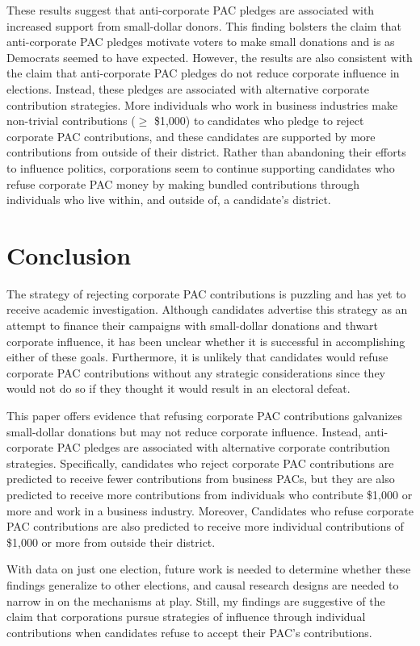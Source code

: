 \documentclass[12pt]{article}
\begin{document}
These results suggest that anti-corporate PAC pledges are associated with increased support from small-dollar donors. This finding bolsters the claim that anti-corporate PAC pledges motivate voters to make small donations and is as Democrats seemed to have expected. However, the results are also consistent with the claim that anti-corporate PAC pledges do not reduce corporate influence in elections. Instead, these pledges are associated with alternative corporate contribution strategies. More individuals who work in business industries make non-trivial contributions ($\geq$ \$1,000) to candidates who pledge to reject corporate PAC contributions, and these candidates are supported by more contributions from outside of their district. Rather than abandoning their efforts to influence politics, corporations seem to continue supporting candidates who refuse corporate PAC money by making bundled contributions through individuals who live within, and outside of, a candidate's district.


\section{Conclusion} \label{sec: conclusion}

The strategy of rejecting corporate PAC contributions is puzzling and has yet to receive academic investigation. Although candidates advertise this strategy as an attempt to finance their campaigns with small-dollar donations and thwart corporate influence, it has been unclear whether it is successful in accomplishing either of these goals. Furthermore, it is unlikely that candidates would refuse corporate PAC contributions without any strategic considerations since they would not do so if they thought it would result in an electoral defeat. 

This paper offers evidence that refusing corporate PAC contributions galvanizes small-dollar donations but may not reduce corporate influence. Instead, anti-corporate PAC pledges are associated with alternative corporate contribution strategies. Specifically, candidates who reject corporate PAC contributions are predicted to receive fewer contributions from business PACs, but they are also predicted to receive more contributions from individuals who contribute \$1,000 or more and work in a business industry. Moreover, Candidates who refuse corporate PAC contributions are also predicted to receive more individual contributions of \$1,000 or more from outside their district.   

With data on just one election, future work is needed to determine whether these findings generalize to other elections, and causal research designs are needed to narrow in on the mechanisms at play. Still, my findings are suggestive of the claim that corporations pursue strategies of influence through individual contributions when candidates refuse to accept their PAC's contributions. 
\end{document}
